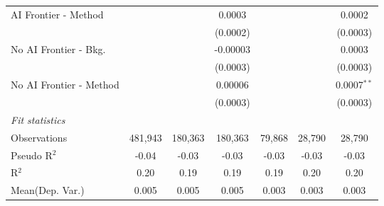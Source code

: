 \begin{tabular}{lcccccc}
   AI Frontier - Method    &                &                & 0.0003         &                &                & 0.0002\\   
                           &                &                & (0.0002)       &                &                & (0.0003)\\   
   No AI Frontier - Bkg.   &                &                & -0.00003       &                &                & 0.0003\\   
                           &                &                & (0.0003)       &                &                & (0.0003)\\   
   No AI Frontier - Method &                &                & 0.00006        &                &                & 0.0007$^{**}$\\   
                           &                &                & (0.0003)       &                &                & (0.0003)\\   
   \midrule
   \emph{Fit statistics}\\
   Observations            & 481,943        & 180,363        & 180,363        & 79,868         & 28,790         & 28,790\\  
   Pseudo R$^2$            & -0.04          & -0.03          & -0.03          & -0.03          & -0.03          & -0.03\\  
   R$^2$                   & 0.20           & 0.19           & 0.19           & 0.19           & 0.20           & 0.20\\  
Mean(Dep. Var.) & 0.005 & 0.005 & 0.005 & 0.003 & 0.003 & 0.003 \\
   

\end{tabular}

